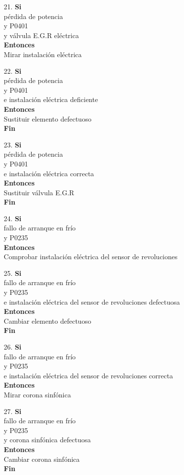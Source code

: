 \documentclass[a4paper,12pt]{article}
\newcommand\tab[1][1cm]{\hspace*{#1}}
\begin{document}
\begin{itemize}
\item[21.]\textbf{Si}\\ \tab pérdida de potencia\\ \tab y P0401\\ \tab y válvula E.G.R eléctrica\\  \textbf{Entonces}\\ \tab Mirar instalación eléctrica
\item[22.]\textbf{Si}\\ \tab pérdida de potencia\\ \tab y P0401\\ \tab e instalación eléctrica deficiente\\ \textbf{Entonces}\\ \tab Sustituir elemento defectuoso\\ \tab \textbf{Fin}
\item[23.]\textbf{Si}\\ \tab pérdida de potencia\\ \tab y P0401\\ \tab e instalación eléctrica correcta\\ \textbf{Entonces}\\ \tab Sustituir válvula E.G.R\\ \tab \textbf{Fin}
\item[24.]\textbf{Si}\\ \tab fallo de arranque en frío\\ \tab y P0235\\ \textbf{Entonces}\\ \tab Comprobar instalación eléctrica del sensor de revoluciones
\item[25.]\textbf{Si}\\ \tab fallo de arranque en frío\\ \tab y P0235\\ \tab e instalación eléctrica del sensor de revoluciones defectuosa \\ \textbf{Entonces}\\ \tab Cambiar elemento defectuoso \\ \tab \textbf{Fin}
\item[26.]\textbf{Si}\\ \tab fallo de arranque en frío\\ \tab y P0235\\ \tab e instalación eléctrica del sensor de revoluciones correcta \\ \textbf{Entonces}\\ \tab Mirar corona sinfónica
\item[27.]\textbf{Si}\\ \tab fallo de arranque en frío\\ \tab y P0235\\ \tab y corona sinfónica defectuosa \\ \textbf{Entonces}\\ \tab Cambiar corona sinfónica \\ \tab \textbf{Fin}

\end{itemize}
\end{document}
